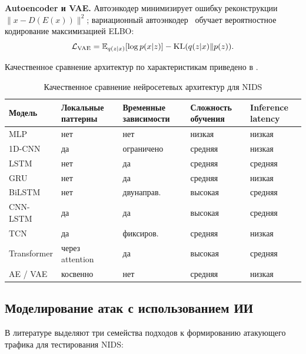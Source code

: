 \textbf{Autoencoder и VAE.} Автоэнкодер минимизирует ошибку
реконструкции \(\|x - D(E(x))\|^2\); вариационный
автоэнкодер~\cite{kingma2014vae} обучает вероятностное кодирование
максимизацией ELBO:
\begin{equation}
\mathcal{L}_{\text{VAE}} =
\mathbb{E}_{q(z|x)}[\log p(x|z)] - \operatorname{KL}(q(z|x)\|p(z)).
\label{eq:vae}
\end{equation}

Качественное сравнение архитектур по характеристикам приведено в
.

\begin{table}[H]
\centering
\caption{Качественное сравнение нейросетевых архитектур для NIDS}
\label{tab:dl-arch-compare}
\renewcommand{\arraystretch}{1.2}
\begin{tabularx}{\linewidth}{@{}lXXXX@{}}
\toprule
\textbf{Модель} & \textbf{Локальные паттерны} & \textbf{Временные зависимости} &
\textbf{Сложность обучения} & \textbf{Inference latency} \\
\midrule
MLP        & нет          & нет        & низкая  & низкая \\
1D-CNN     & да           & ограничено & средняя & низкая \\
LSTM       & нет          & да         & средняя & средняя \\
GRU        & нет          & да         & средняя & низкая \\
BiLSTM     & нет          & двунаправ. & высокая & средняя \\
CNN-LSTM   & да           & да         & высокая & средняя \\
TCN        & да           & фиксиров.  & средняя & низкая \\
Transformer & через attention & да     & высокая & средняя \\
AE / VAE   & косвенно     & нет        & средняя & низкая \\
\bottomrule
\end{tabularx}
\end{table}

\subsection{Моделирование атак с использованием ИИ}

В литературе выделяют три семейства подходов к формированию атакующего
трафика для тестирования NIDS:

